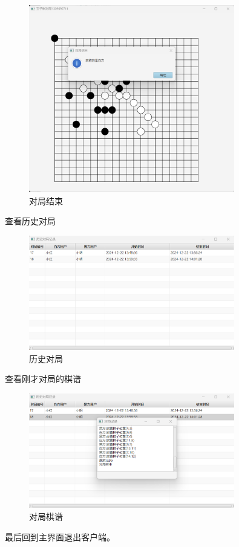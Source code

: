 \documentclass[utf8]{article}
\begin{document}
\begin{figure}[H]
    \centering
    \includegraphics[width=0.8\textwidth]{pictures/21}
    \caption{对局结束}
\end{figure}
查看历史对局
\begin{figure}[H]
    \centering
    \includegraphics[width=0.8\textwidth]{pictures/22}
    \caption{历史对局}
\end{figure}
查看刚才对局的棋谱
\begin{figure}[H]
    \centering
    \includegraphics[width=0.8\textwidth]{pictures/23}
    \caption{对局棋谱}
\end{figure}
最后回到主界面退出客户端。
\end{document}
